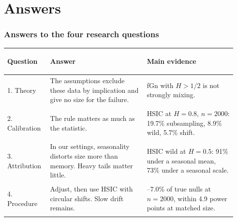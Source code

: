 \documentclass[11pt, aspectratio=169, xcolor={dvipsnames}]{beamer}
\begin{document}
\section{Answers}
\begin{frame}
\frametitle{Answers to the four research questions}
\small
\renewcommand{\arraystretch}{1.25}
\begin{tabular}{@{}>{\bfseries\raggedright}p{0.17\linewidth}>{\raggedright}p{0.4\linewidth}>{\raggedright\arraybackslash}p{0.37\linewidth}@{}}
\toprule
Question & Answer & Main evidence \\
\midrule
1. Theory & The assumptions exclude these data by implication and give no size for the failure. & fGn with $H>1/2$ is not strongly mixing. \\
2. Calibration & The rule matters as much as the statistic. & HSIC at $H=0.8$, $n=2000$: 19.7\% subsampling, 8.9\% wild, 5.7\% shift. \\
3. Attribution & In our settings, seasonality distorts size more than memory. Heavy tails matter little. & HSIC wild at $H=0.5$: 91\% under a seasonal mean, 73\% under a seasonal scale. \\
4. Procedure & Adjust, then use HSIC with circular shifts. Slow drift remains. & 3.8--7.0\% of true nulls at $n=2000$, within 4.9 power points at matched size. \\
\bottomrule
\end{tabular}
\end{frame}
\end{document}
